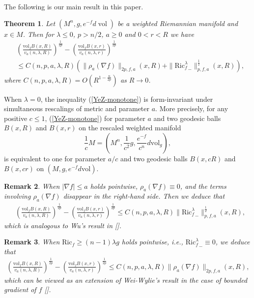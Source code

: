 \documentclass[11pt]{amsart}
\numberwithin{equation}{section}
\newtheorem{theorem}{Theorem}[section]
\newtheorem{remark}[theorem]{Remark}
\newcommand{\vol}{\mathrm{vol}}
\begin{document}
The following is our main result in this paper.

    \begin{theorem}\label{YeZ-theorem}
    	Let $(M^n,g,e^{-f}d\operatorname{vol})$ be a weighted Riemannian manifold and $x\in M$. Then for $\lambda\leq 0$, $p>n/2$, $a\geq 0$ and $0<r<R$ we have
    	\begin{equation}\label{YeZ-monotone}
    	\begin{aligned}
    		&\left(\frac{\vol_f B(x,R)}{v_a(n,\lambda,R)}\right)^{\frac{1}{2p}}-\left(\frac{\vol_f B(x,r)}{v_a(n,\lambda,r)}\right)^{\frac{1}{2p}}\\
    		&\leq
    		C(n,p,a,\lambda,R)\left(\|\rho_a(\nabla f)\|_{2p,f,a}(x,R)+\|{\mathrm{Ric}_f^\lambda}_-\|^{\frac{1}{2}}_{p,f,a}(x,R)\right),
    	\end{aligned}
    	\end{equation}
    	where $C(n,p,a,\lambda,R)=O(R^{1-\frac{n}{2p}})$ as $R\to 0$.
    \end{theorem}
    
    When $\lambda=0$,  the inequality (\ref{YeZ-monotone}) is form-invariant under simultaneous rescalings of  metric and  parameter $a$. More precisely, for any positive  $c\le 1$, 
 (\ref{YeZ-monotone}) for  parameter $a$ and
two geodesic balls  $B(x,R)$ and  $B(x,r)$ on the rescaled weighted manifold
    \[ \frac{1}{c}M=(M^n,\frac{1}{c^2}g,\frac{e^{-f}}{c^n}d\vol_g), 
    \]
   is equivalent to one  for  parameter $a/c$  and two geodesic balls  $B(x, cR)$ and  $B(x, cr)$  on  $(M,g,e^{-f}d\vol)$.
    
    \begin{remark}
    When $|\nabla f|\leq a$ holds pointwise,   $\rho_a(\nabla f)\equiv 0$, and the terms involving $\rho_a(\nabla f)$ disappear in the right-hand side.   Then we deduce that
    \begin{align*}
    	&\left(\frac{\vol_fB(x,R)}{v_a(n,\lambda,R)}\right)^{\frac{1}{2p}}-\left(\frac{\vol_fB(x,r)}{v_a(n,\lambda,r)}\right)^{\frac{1}{2p}}\leq C(n,p,a,\lambda,R)\|{\mathrm{Ric}_f^\lambda}_-\|_{p,f,a}^{\frac{1}{2}}(x,R),
    \end{align*}
    which is analogous to Wu's result in [\cite{Wu}].
    \end{remark}
    \begin{remark}
    	When $\mathrm{Ric}_f\geq (n-1)\lambda g$ holds pointwise, i.e., ${\mathrm{Ric}_f^\lambda}_-\equiv 0$,  we deduce that
    	\begin{align*}
    		\left(\frac{\vol_f B(x,R)}{v_a(n,\lambda,R)}\right)^{\frac{1}{2p}}-\left(\frac{\vol_f B(x,r)}{v_a(n,\lambda,r)}\right)^{\frac{1}{2p}}\leq
    		C(n,p,a,\lambda,R)\|\rho_a(\nabla f)\|_{2p,f,a}(x,R),
    	\end{align*}
    	which can be viewed as an extension of Wei-Wylie's result  in the case of bounded gradient of $f$ [\cite{WW}].
    \end{remark}
\end{document}

